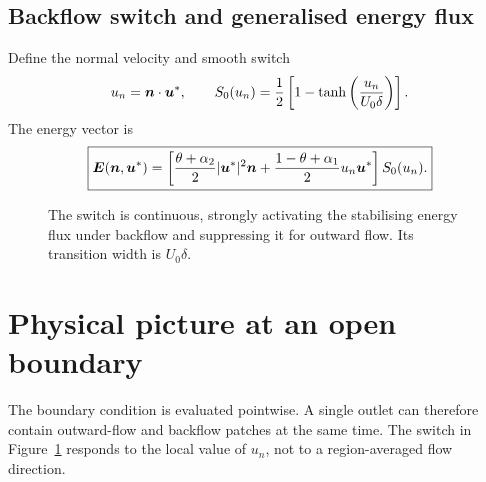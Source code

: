 \subsection{Backflow switch and generalised energy flux}

Define the normal velocity and smooth switch
\begin{equation}
  u_n=\boldsymbol{n}\cdot\boldsymbol{u}^*,
  \qquad
  S_0(u_n)=\frac12\left[1-\tanh\left(\frac{u_n}{U_0\delta}\right)\right].
  \label{houtflow:eq:switch}
\end{equation}
The energy vector is
\begin{equation}
  \boxed{
  \boldsymbol{E}(\boldsymbol{n},\boldsymbol{u}^*)=
  \left[
    \frac{\theta+\alpha_2}{2}\lvert\boldsymbol{u}^*\rvert^2\boldsymbol{n}
    +\frac{1-\theta+\alpha_1}{2}u_n\boldsymbol{u}^*
  \right]S_0(u_n).}
  \label{houtflow:eq:energy}
\end{equation}

\begin{figure}[htbp]
\centering
{}
\caption{The switch is continuous, strongly activating the stabilising
energy flux under backflow and suppressing it for outward flow.  Its
transition width is $U_0\delta$.}
\label{houtflow:fig:switch}
\end{figure}

\section{Physical picture at an open boundary}

The boundary condition is evaluated pointwise.  A single outlet can therefore
contain outward-flow and backflow patches at the same time.  The switch in
Figure~\ref{houtflow:fig:switch} responds to the local value of $u_n$, not to a
region-averaged flow direction.

